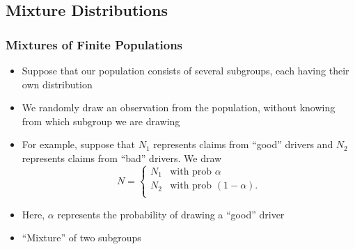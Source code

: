 \documentclass{beamer}
\begin{document}
\subsection{Mixture Distributions}

\begin{frame}[shrink=2]%
\frametitle{Mixtures of Finite Populations}
\begin{itemize}
\item Suppose that our population consists of several subgroups, each having their own
distribution \vspace{2mm}
\item We randomly draw an observation from the population, without knowing from which subgroup we are drawing
\vspace{2mm}
\item For example, suppose that $N_1$ represents claims from ``good'' drivers and $N_2$ represents claims from ``bad'' drivers. We draw
\begin{equation*}
N =
\begin{cases}
N_1  &  \text{with prob~}\alpha\\
N_2  &   \text{with prob~}(1-\alpha) .\\
\end{cases}
\end{equation*} \vspace{2mm}
\item Here, $\alpha$ represents the probability of drawing a ``good''
driver \vspace{2mm}
\item ``Mixture'' of two subgroups
 \end{itemize}
\end{frame}
\end{document}
